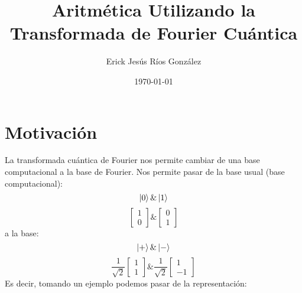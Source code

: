 \documentclass{article}
\title{Aritmética Utilizando la Transformada de Fourier Cuántica}
\author{Erick Jesús Ríos González}
\date{\today}
\begin{document}
\maketitle
\section{Motivación}
La transformada cuántica de Fourier nos permite cambiar de una 
base computacional a la base de Fourier. Nos permite pasar de 
la base usual (base computacional):
\[\ket{0} \& \ket{1}\]
\[\begin{bmatrix}
    1 \\
    0
\end{bmatrix} \&
\begin{bmatrix}
    0\\
    1
\end{bmatrix}\]
a la base:
\[\ket{+} \& \ket{-}\]
\[\frac{1}{\sqrt{2}}\begin{bmatrix}
    1 \\
    1
\end{bmatrix} \&\frac{1}{\sqrt{2}}
\begin{bmatrix}
    1\\
    -1
\end{bmatrix}\]
Es decir, tomando un ejemplo
podemos pasar de la representación:
\end{document}

